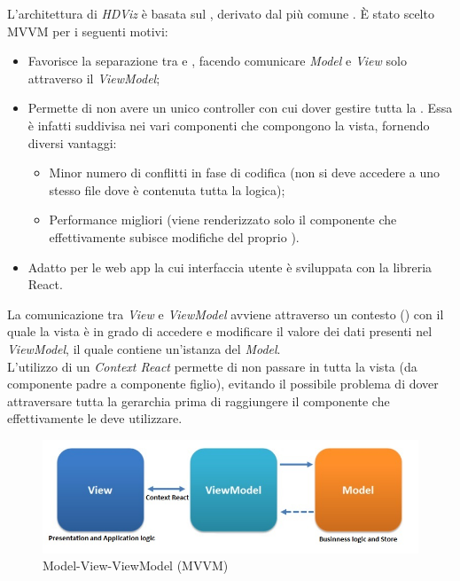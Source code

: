 L'architettura di \textit{HDViz} è basata sul  , derivato dal più comune . 
È stato scelto MVVM per i seguenti motivi: 
\begin{itemize}
	\item Favorisce la separazione tra  e , facendo comunicare \textit{Model} e \textit{View} solo attraverso il \textit{ViewModel};  
	\item Permette di non avere un unico controller con cui dover gestire tutta la . Essa è infatti suddivisa nei vari componenti che compongono la vista, fornendo diversi vantaggi: 
	\begin{itemize}
		\item Minor numero di conflitti in fase di codifica (non si deve accedere a uno stesso file dove è contenuta tutta la logica);
		\item Performance migliori (viene renderizzato solo il componente che effettivamente subisce modifiche del proprio ).
	\end{itemize}
	\item Adatto per le web app la cui interfaccia utente è sviluppata con la libreria React.
\end{itemize}

La comunicazione tra \textit{View} e \textit{ViewModel} avviene attraverso un contesto () con il quale la vista è in grado di accedere e modificare il valore dei dati presenti nel \textit{ViewModel}, il quale contiene un'istanza del \textit{Model}. \\
L'utilizzo di un \textit{Context React} permette di non passare  in tutta la vista (da componente padre a componente figlio), evitando il possibile problema di dover attraversare tutta la gerarchia prima di raggiungere il componente che effettivamente le deve utilizzare.

\begin{figure}[hb]
\includegraphics[width=15.8cm]{Extra/MVVMPattern}
\centering
\caption{Model-View-ViewModel (MVVM)}
\end{figure}